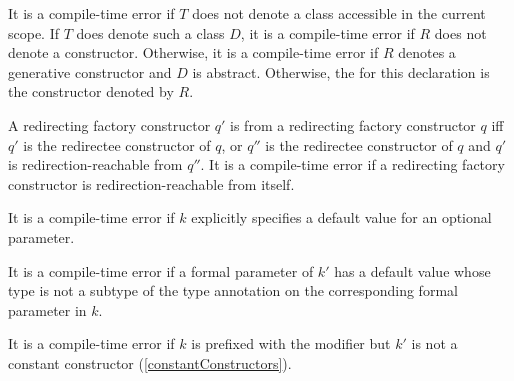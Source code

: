 \documentclass[makeidx]{article}
\begin{document}
\LMHash{}%
It is a compile-time error if $T$ does not denote
a class accessible in the current scope.
If $T$ does denote such a class $D$,
it is a compile-time error if $R$ does not denote a constructor.
Otherwise, it is a compile-time error
if $R$ denotes a generative constructor and $D$ is abstract.
Otherwise, the
for this declaration is the constructor  denoted by $R$.

\LMHash{}%
A redirecting factory constructor $q'$ is 
from a redirecting factory constructor $q$ if{}f
$q'$ is the redirectee constructor of $q$,
or $q''$ is the redirectee constructor of $q$
and $q'$ is redirection-reachable from $q''$.
It is a compile-time error if a redirecting factory constructor
is redirection-reachable from itself.

\LMHash{}%
It is a compile-time error if $k$ explicitly specifies
a default value for an optional parameter.


\LMHash{}%
It is a compile-time error if a formal parameter of $k'$ has a default value
whose type is not a subtype of the type annotation
on the corresponding formal parameter in $k$.



\LMHash{}%
It is a compile-time error if $k$ is prefixed with the \CONST{} modifier
but $k'$ is not a constant constructor (\ref{constantConstructors}).
\end{document}
